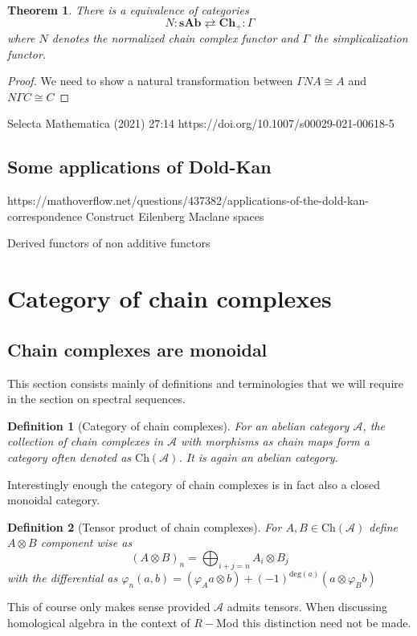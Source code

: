 \documentclass[12pt]{article}
\numberwithin{equation}{section}
\newtheorem{theorem}{Theorem}[section]
\newtheorem{definition}{Definition}[section]
\begin{document}
	\begin{theorem}
		There is a equivalence of categories $$N:\mathbf{sAb}\rightleftarrows \mathbf{Ch}_+: \Gamma$$ where $N$ denotes the normalized chain complex functor and $\Gamma$ the simplicalization functor.
	\end{theorem}
	\begin{proof}
		We need to show a natural transformation between $\Gamma N A \cong A$ and $N \Gamma C \cong C$
	\end{proof}
	Selecta Mathematica (2021) 27:14
	https://doi.org/10.1007/s00029-021-00618-5	
	\subsection{Some applications of Dold-Kan}
	https://mathoverflow.net/questions/437382/applications-of-the-dold-kan-correspondence
	Construct Eilenberg Maclane spaces
	
	Derived functors of non additive functors
	\section{Category of chain complexes}
	\subsection{Chain complexes are monoidal}
	This section consists mainly of definitions and terminologies that we will require in the section on spectral sequences.
	\begin{definition}[Category of chain complexes]
		For an abelian category $\mathcal{A}$, the collection of chain complexes in $\mathcal{A}$ with morphisms as chain maps form a category often denoted as $\mathrm{Ch}(\mathcal{A})$. It is again an abelian category.
	\end{definition}
	Interestingly enough the category of chain complexes is in fact also a closed monoidal category.
	
	\begin{definition}[Tensor product of chain complexes]\label{tensorchain}
		For $A, B \in \mathrm{Ch}(\mathcal{A})$ define $A \otimes B$ component wise as \[ (A \otimes B)_n = \bigoplus_{i+j=n} A_i \otimes B_j\] with the differential as $ \varphi_n(a,b)=(\varphi_Aa\otimes b)+(-1)^{\mathrm{deg}(a)}(a \otimes \varphi_B b)$
	\end{definition}
	This of course only makes sense provided $\mathcal{A}$ admits tensors. When discussing homological algebra in the context of $R-$Mod this distinction need not be made.
	
\end{document}
